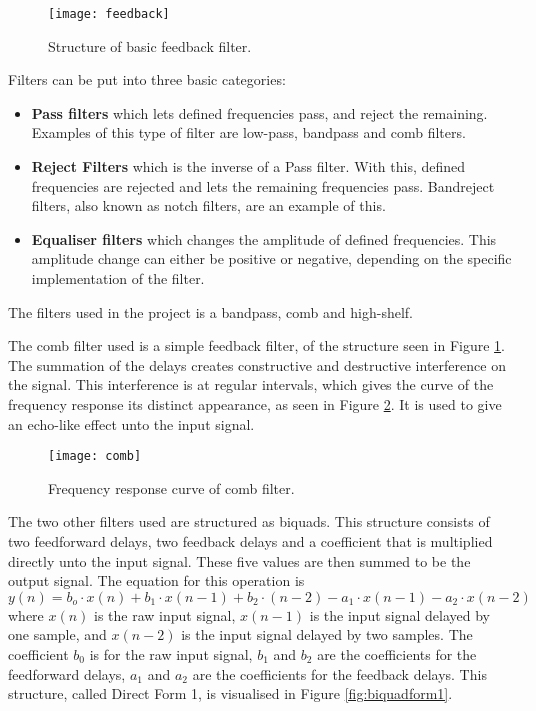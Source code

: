 \begin{figure}
\centering
\texttt{[image: feedback]}
\caption{Structure of basic feedback filter.}
\label{fig:feedback}
\end{figure}

Filters can be put into three basic categories:
\begin{itemize}
\item \textbf{Pass filters} which lets defined frequencies pass, and reject the remaining. Examples of this type of filter are low-pass, bandpass and comb filters.
\item \textbf{Reject Filters} which is the inverse of a Pass filter. With this, defined frequencies are rejected and lets the remaining frequencies pass. Bandreject filters, also known as notch filters, are an example of this.
\item \textbf{Equaliser filters} which changes the amplitude of defined frequencies. This amplitude change can either be positive or negative, depending on the specific implementation of the filter. 
\end{itemize}

The filters used in the project is a bandpass, comb and high-shelf.

The comb filter used is a simple feedback filter, of the structure seen in Figure \ref{fig:feedback}. The summation of the delays creates constructive and destructive interference on the signal. This interference is at regular intervals, which gives the curve of the frequency response its distinct appearance, as seen in Figure \ref{fig:comb}. It is used to give an echo-like effect unto the input signal.

\begin{figure}
\centering
\texttt{[image: comb]}
\caption{Frequency response curve of comb filter.}
\label{fig:comb}
\end{figure}

The two other filters used are structured as biquads. This structure consists of two feedforward delays, two feedback delays and a coefficient that is multiplied directly unto the input signal. These five values are then summed to be the output signal. The equation for this operation is 
\[y(n) = b_o \cdot x(n) + b_1 \cdot x(n-1) + b_2 \cdot (n-2) - a_1 \cdot x(n-1) - a_2 \cdot x(n-2)\] \cite{Redmon2003}
where \(x(n)\) is the raw input signal, \(x(n-1)\) is the input signal delayed by one sample, and \(x(n-2)\) is the input signal delayed by two samples. The coefficient \(b_0\) is for the raw input signal, \(b_1\) and \(b_2\) are the coefficients for the feedforward delays, \(a_1\) and \(a_2\) are the coefficients for the feedback delays. This structure, called Direct Form 1, is visualised in Figure \ref{fig:biquadform1}.

